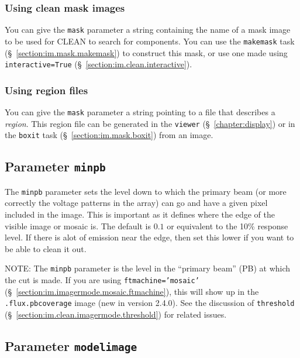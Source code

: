 \subsubsection{Using clean mask images}
\label{section:im.clean.mask.maskimage}

You can give the {\tt mask} parameter a string containing the
name of a mask image to be used for CLEAN to search for components.  
You can use the {\tt makemask} task
(\S~\ref{section:im.mask.makemask}) to construct this mask, or use 
one made using {\tt interactive=True}
(\S~\ref{section:im.clean.interactive}).

\subsubsection{Using region files}
\label{section:im.clean.mask.regions}

You can give the {\tt mask} parameter a string pointing to a file
that describes a {\it region}.  This region file can be generated
in the {\tt viewer} (\S~\ref{chapter:display}) or in the {\tt boxit}
task (\S~\ref{section:im.mask.boxit}) from an image.

\subsection{Parameter {\tt minpb} }
\label{section:im.clean.minpb}

The {\tt minpb} parameter sets the level down to which the primary
beam (or more correctly the voltage patterns in the array) can go and
have a given pixel included in the image.  This is important as it
defines where the edge of the visible image or mosaic is. 
The default is $0.1$ or
equivalent to the 10\% response level.  If there is alot of emission
near the edge, then set this lower if you want to be
able to clean it out.

NOTE: The {\tt minpb} parameter is the level in the ``primary beam''
(PB) at which the cut is made.  If you are using {\tt ftmachine='mosaic'}
(\S~\ref{section:im.imagermode.mosaic.ftmachine}), this will show
up in the {\tt .flux.pbcoverage} image (new in version 2.4.0).
See the discussion of {\tt threshold} 
(\S~\ref{section:im.clean.imagermode.threshold}) for related issues.

\subsection{Parameter {\tt modelimage} }
\label{section:im.clean.modelimage}

